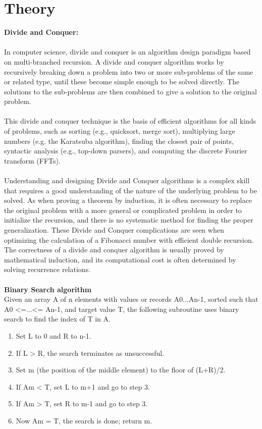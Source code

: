 \documentclass[10pt,a4paper]{article}
\begin{document}
\section{Theory}
\textbf{Divide and Conquer:}
\\\\
In computer science, divide and conquer is an algorithm design paradigm based on multi-branched recursion. A divide and conquer algorithm works by recursively breaking down a problem into two or more sub-problems of the same or related type, until these become simple enough to be solved directly. The solutions to the sub-problems are then combined to give a solution to the original problem.
\\\\This divide and conquer technique is the basis of efficient algorithms for all kinds of problems, such as sorting (e.g., quicksort, merge sort), multiplying large numbers (e.g. the Karatsuba algorithm), finding the closest pair of points, syntactic analysis (e.g., top-down parsers), and computing the discrete Fourier transform (FFTs).
\\\\Understanding and designing Divide and Conquer algorithms is a complex skill that requires a good understanding of the nature of the underlying problem to be solved. As when proving a theorem by induction, it is often necessary to replace the original problem with a more general or complicated problem in order to initialize the recursion, and there is no systematic method for finding the proper generalization. These Divide and Conquer complications are seen when optimizing the calculation of a Fibonacci number with efficient double recursion.
\\The correctness of a divide and conquer algorithm is usually proved by mathematical induction, and its computational cost is often determined by solving recurrence relations.
\\\\
\textbf{Binary Search algorithm}
\\Given an array A of n elements with values or records A0...An-1, sorted such that A0 <=...<= An-1, and target value T, the following subroutine uses binary search to find the index of T in A.
\\
\begin{enumerate}
\item Set L to 0 and R to n-1.
\item If L > R, the search terminates as unsuccessful.
\item Set m (the position of the middle element) to the floor of (L+R)/2.
\item If Am < T, set L to m+1 and go to step 3.
\item If Am > T, set R to m-1 and go to step 3.
\item Now Am = T, the search is done; return m.
\end{enumerate}
    
\end{document}
